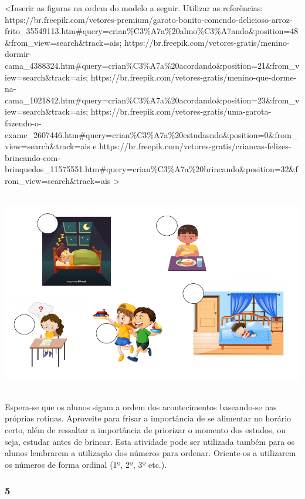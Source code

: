 \textless{}Inserir as figuras na ordem do modelo a seguir. Utilizar as
referências:
https://br.freepik.com/vetores-premium/garoto-bonito-comendo-delicioso-arroz-frito\_35549113.htm\#query=crian\%C3\%A7a\%20almo\%C3\%A7ando\&position=48\&from\_view=search\&track=ais;
https://br.freepik.com/vetores-gratis/menino-dormir-cama\_4388324.htm\#query=crian\%C3\%A7a\%20acordando\&position=21\&from\_view=search\&track=ais;
https://br.freepik.com/vetores-gratis/menino-que-dorme-na-cama\_1021842.htm\#query=crian\%C3\%A7a\%20acordando\&position=23\&from\_view=search\&track=ais;
https://br.freepik.com/vetores-gratis/uma-garota-fazendo-o-exame\_2607446.htm\#query=crian\%C3\%A7a\%20estudasndo\&position=0\&from\_view=search\&track=ais
e
https://br.freepik.com/vetores-gratis/criancas-felizes-brincando-com-brinquedos\_11575551.htm\#query=crian\%C3\%A7a\%20brincando\&position=32\&from\_view=search\&track=ais
\textgreater{}

\includegraphics[width=5.90556in,height=3.46597in]{media/image36.png}

Espera-se que os alunos sigam a ordem dos acontecimentos
baseando-se nas próprias rotinas. Aproveite para frisar a importância de
se alimentar no horário certo, além de
ressaltar a importância de priorizar o momento dos estudos, ou seja,
estudar antes de brincar. Esta atividade pode ser utilizada também para
os alunos lembrarem a utilização dos números para ordenar.
Oriente-os a utilizarem os números de forma ordinal (1º, 2º, 3º etc.).

\subsubsection{5}\label{section-43}

